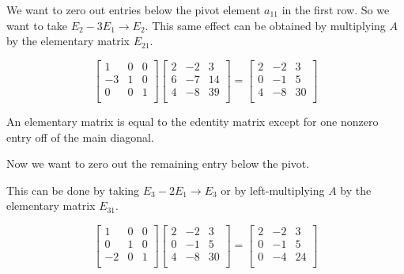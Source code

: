 We want to zero out entries below the pivot element $a_{11}$ in the first row.
So we want to take $E_2-3E_1 \to E_2$. This same effect can be obtained by
multiplying $A$ by the elementary matrix $E_{21}$.

\begin{equation*}
  \begin{bmatrix}
    1 & 0 & 0\\
    -3 & 1 & 0\\
    0 & 0 & 1\\
  \end{bmatrix}
  \begin{bmatrix}
    2 & -2 & 3\\
    6 & -7 & 14\\
    4 & -8 & 39\\
  \end{bmatrix}
  =
  \begin{bmatrix}
    2 & -2 & 3\\
    0 & -1 & 5\\
    4 & -8 & 30\\
  \end{bmatrix}
\end{equation*}

An elementary matrix is equal to the edentity matrix except for one nonzero
entry off of the main diagonal.

Now we want to zero out the remaining entry below the pivot.

This can be done by taking $E_3-2E_1 \to E_3$ or by left-multiplying $A$ by the
elementary matrix $E_{31}$.

\begin{equation*}
  \begin{bmatrix}
    1 & 0 & 0\\
    0 & 1 & 0\\
    -2 & 0 & 1\\
  \end{bmatrix}
  \begin{bmatrix}
    2 & -2 & 3\\
    0 & -1 & 5\\
    4 & -8 & 30\\
  \end{bmatrix}
  =
  \begin{bmatrix}
    2 & -2 & 3\\
    0 & -1 & 5\\
    0 & -4 & 24\\
  \end{bmatrix}
\end{equation*}

